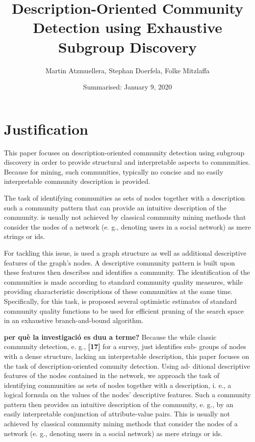 \documentclass[a4paper]{article}
\title{Description-Oriented Community Detection using Exhaustive Subgroup Discovery}
\date{Summarised: January 9, 2020}
\author{Martin Atzmuellera, Stephan Doerfela, Folke Mitzlaffa}
\begin{document}
\maketitle
\section{Justification}

This paper focuses on description-oriented community detection using subgroup discovery in order to provide structural and interpretable aspects to communities. Because for mining, such communities, typically no concise and no easily interpretable community description is provided. 

The task of identifying communities as sets of nodes together with a description such a community pattern that can provide an intuitive description of the community. is usually not achieved by classical community mining methods that consider the nodes of a network (e. g., denoting users in a social network) as mere strings or ids.

For tackling this issue, is used a graph structure as well as additional descriptive features of the graph's nodes. A descriptive community pattern is built upon these features then describes and identifies a community. The identification of the communities is made according to standard community quality measures, while providing characteristic descriptions of these communities at the same time. Specifically, for this task, is proposed several optimistic estimates of standard community quality functions to be used for efficient pruning of the search space in an exhaustive branch-and-bound algorithm.

{\bf per què la investigació es duu a terme?} Because the while classic community detection, e. g., {\bf [17]} for a survey, just identifies sub- groups of nodes with a dense structure, lacking an interpretable description, this paper focuses on the task of description-oriented comunity detection. Using ad- ditional descriptive features of the nodes contained in the network, we approach the task of identifying communities as sets of nodes together with a description, i. e., a logical formula on the values of the nodes’ descriptive features. Such a community pattern then provides an intuitive description of the community, e. g., by an easily interpretable conjunction of attribute-value pairs. This is usually not achieved by classical community mining methods that consider the nodes of a network (e. g., denoting users in a social network) as mere strings or ids.
\end{document}
